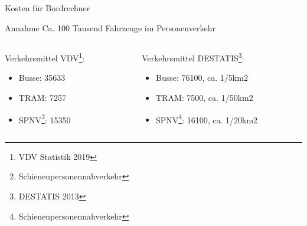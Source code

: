
\begin{frame}{Kosten für Bordrechner}

  \begin{block}{Annahme}
    Ca. 100 Tausend Fahrzeuge im Personenverkehr
  \end{block}

  \begin{columns}

    \begin{column}{0.5\textwidth}
      \minipage[c][0.65\textheight][s]{\columnwidth}
      Verkehrsmittel VDV\footnote{VDV Statistik 2019}:
      \begin{itemize}
      \item Busse: 35633
      \item TRAM: 7257
      \item SPNV\footnote{Schienenpersonennahverkehr}: 15350
      \end{itemize}
      \endminipage
    
    \end{column}

    \begin{column}{0.5\textwidth}
      \minipage[c][0.65\textheight][s]{\columnwidth}
    Verkehrsmittel DESTATIS\footnote{DESTATIS 2013}:
    \begin{itemize}
    \item Busse: 76100, ca. 1/5km2
    \item TRAM: 7500, ca. 1/50km2
    \item SPNV\footnote{Schienenpersonennahverkehr}: 16100, ca. 1/20km2
    \end{itemize}
    \endminipage
    \end{column}

  \end{columns}

\end{frame}

